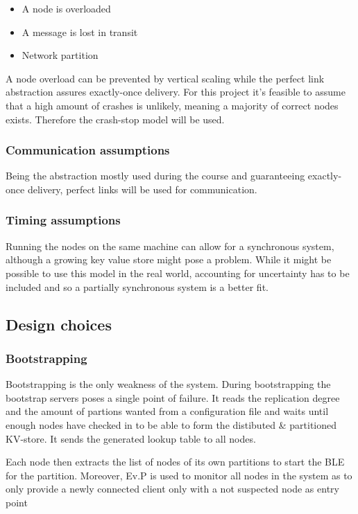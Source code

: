 \documentclass[a4paper]{scrartcl}
\begin{document}
\begin{itemize}
\item A node is overloaded
\item A message is lost in transit
\item Network partition
\end{itemize}

A node overload can be prevented by vertical scaling while the perfect link abstraction assures exactly-once delivery.
For this project it’s feasible to assume that a high amount of crashes is unlikely, meaning a majority of correct nodes exists. Therefore the crash-stop model will be used.


\subsubsection{Communication assumptions}
Being the abstraction mostly used during the course and guaranteeing exactly-once delivery, perfect links will be used for communication.

\subsubsection{Timing assumptions}
Running the nodes on the same machine can allow for a synchronous system, although a growing key value store might pose a problem. While it might be possible to use this model in the real world, accounting for uncertainty has to be included and so a partially synchronous system is a better fit.

\subsection{Design choices}


\subsubsection{Bootstrapping}
Bootstrapping is the only weakness of the system.
During bootstrapping the bootstrap servers poses a single point of failure.
It reads the replication degree and the amount of partions wanted from a configuration file and waits until enough nodes have checked in to be able to form the distibuted \& partitioned KV-store.
It sends the generated lookup table to all nodes.

Each node then extracts the list of nodes of its own partitions to start the BLE for the partition.
Moreover, Ev.P is used to monitor all nodes in the system as to only provide a newly connected client only with a not suspected node as entry point
\end{document}
